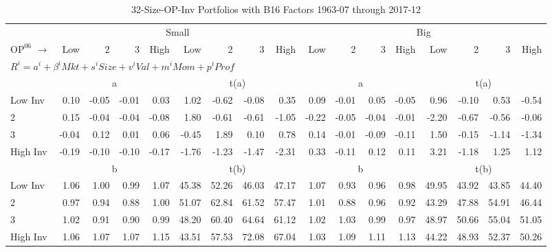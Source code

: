 
\begin{table}[!ht]
\footnotesize
\centering
\caption{32-Size-OP-Inv Portfolios with B16 Factors 1963-07 through 2017-12}
\begin{tabular}{lrrrrrrrrrrrrrrrr}
  \toprule
     & \multicolumn{8}{c}{Small} & \multicolumn{8}{c}{Big}  \\
     \cmidrule(r){2-9} \cmidrule(r){10-17}
    $\text{OP}^{06}$ $\rightarrow$ & Low & 2 & 3 & High & Low & 2 & 3 & High & Low & 2 & 3 & High & Low & 2 & 3 & High  \\ 
  \midrule
  \multicolumn{17}{l}{$R^i=a^i+\beta^iMkt+s^iSize+v^iVal+m^iMom+p^iProf$}  \\
  
     & \multicolumn{4}{c}{a} & \multicolumn{4}{c}{t(a)}  & \multicolumn{4}{c}{a} & \multicolumn{4}{c}{t(a)}   \\
     \cmidrule(r){2-5} \cmidrule(r){6-9}  \cmidrule(r){10-13} \cmidrule(r){14-17} 
    Low Inv  & 0.10  & -0.05  & -0.01  & 0.03  & 1.02  & -0.62  & -0.08  & 0.35  & 0.09  & -0.01  & 0.05  & -0.05  & 0.96  & -0.10  & 0.53  & -0.54   \\
    2  & 0.15  & -0.04  & -0.04  & -0.08  & 1.80  & -0.61  & -0.61  & -1.05  & -0.22  & -0.05  & -0.04  & -0.01  & -2.20  & -0.67  & -0.56  & -0.06   \\
    3  & -0.04  & 0.12  & 0.01  & 0.06  & -0.45  & 1.89  & 0.10  & 0.78  & 0.14  & -0.01  & -0.09  & -0.11  & 1.50  & -0.15  & -1.14  & -1.34   \\
    High Inv  & -0.19  & -0.10  & -0.10  & -0.17  & -1.76  & -1.23  & -1.47  & -2.31  & 0.33  & -0.11  & 0.12  & 0.11  & 3.21  & -1.18  & 1.25  & 1.12   \\
    
  
     & \multicolumn{4}{c}{b} & \multicolumn{4}{c}{t(b)}  & \multicolumn{4}{c}{b} & \multicolumn{4}{c}{t(b)}   \\
     \cmidrule(r){2-5} \cmidrule(r){6-9}  \cmidrule(r){10-13} \cmidrule(r){14-17} 
    Low Inv  & 1.06  & 1.00  & 0.99  & 1.07  & 45.38  & 52.26  & 46.03  & 47.17  & 1.07  & 0.93  & 0.96  & 0.98  & 49.95  & 43.92  & 43.85  & 44.40   \\
    2  & 0.97  & 0.94  & 0.88  & 1.00  & 51.07  & 62.84  & 61.52  & 57.47  & 1.01  & 0.88  & 0.96  & 0.92  & 43.29  & 47.88  & 54.91  & 46.44   \\
    3  & 1.02  & 0.91  & 0.90  & 0.99  & 48.20  & 60.40  & 64.64  & 61.12  & 1.02  & 1.03  & 0.99  & 0.97  & 48.97  & 50.66  & 55.04  & 51.05   \\
    High Inv  & 1.06  & 1.07  & 1.07  & 1.15  & 43.51  & 57.53  & 72.08  & 67.04  & 1.03  & 1.09  & 1.11  & 1.13  & 44.22  & 48.93  & 52.37  & 50.26   \\
    

\end{tabular}
\end{table}
